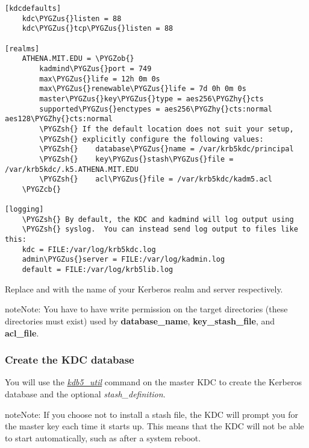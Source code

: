 \documentclass[letterpaper,10pt,english]{sphinxmanual}
\def\PYGZus{\char`\_}
\def\PYGZob{\char`\{}
\def\PYGZcb{\char`\}}
\def\PYGZsh{\char`\#}
\def\PYGZhy{\char`\-}
\begin{document}
\begin{Verbatim}[commandchars=\\\{\}]
[kdcdefaults]
    kdc\PYGZus{}listen = 88
    kdc\PYGZus{}tcp\PYGZus{}listen = 88

[realms]
    ATHENA.MIT.EDU = \PYGZob{}
        kadmind\PYGZus{}port = 749
        max\PYGZus{}life = 12h 0m 0s
        max\PYGZus{}renewable\PYGZus{}life = 7d 0h 0m 0s
        master\PYGZus{}key\PYGZus{}type = aes256\PYGZhy{}cts
        supported\PYGZus{}enctypes = aes256\PYGZhy{}cts:normal aes128\PYGZhy{}cts:normal
        \PYGZsh{} If the default location does not suit your setup,
        \PYGZsh{} explicitly configure the following values:
        \PYGZsh{}    database\PYGZus{}name = /var/krb5kdc/principal
        \PYGZsh{}    key\PYGZus{}stash\PYGZus{}file = /var/krb5kdc/.k5.ATHENA.MIT.EDU
        \PYGZsh{}    acl\PYGZus{}file = /var/krb5kdc/kadm5.acl
    \PYGZcb{}

[logging]
    \PYGZsh{} By default, the KDC and kadmind will log output using
    \PYGZsh{} syslog.  You can instead send log output to files like this:
    kdc = FILE:/var/log/krb5kdc.log
    admin\PYGZus{}server = FILE:/var/log/kadmin.log
    default = FILE:/var/log/krb5lib.log
\end{Verbatim}

Replace  and  with the name of
your Kerberos realm and server respectively.

\begin{notice}{note}{Note:}
You have to have write permission on the target directories
(these directories must exist) used by \textbf{database\_name},
\textbf{key\_stash\_file}, and \textbf{acl\_file}.
\end{notice}


\subsubsection{Create the KDC database}
\label{admin/install_kdc:create-the-kdc-database}\label{admin/install_kdc:create-db}
You will use the {\hyperref[admin/admin_commands/kdb5_util:kdb5-util-8]{\emph{kdb5\_util}}} command on the master KDC to
create the Kerberos database and the optional \emph{stash\_definition}.

\begin{notice}{note}{Note:}
If you choose not to install a stash file, the KDC will
prompt you for the master key each time it starts up.  This
means that the KDC will not be able to start automatically,
such as after a system reboot.
\end{notice}
\end{document}

